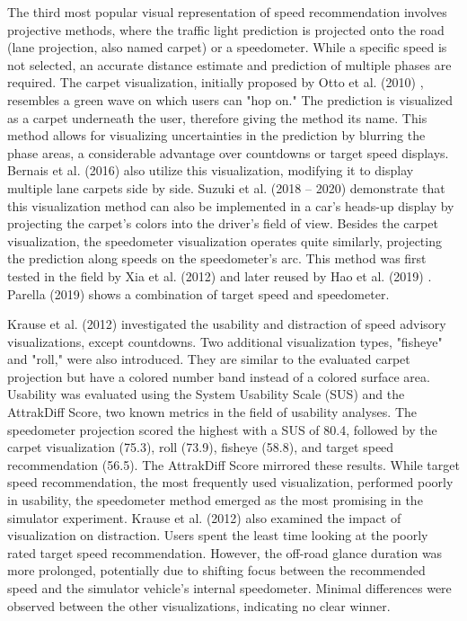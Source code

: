 The third most popular visual representation of speed recommendation involves projective methods, where the traffic light prediction is projected onto the road (lane projection, also named carpet) or a speedometer. While a specific speed is not selected, an accurate distance estimate and prediction of multiple phases are required. The carpet visualization, initially proposed by Otto et al. (2010) \cite{otto_operating_2010}, resembles a green wave on which users can "hop on." The prediction is visualized as a carpet underneath the user, therefore giving the method its name. This method allows for visualizing uncertainties in the prediction by blurring the phase areas, a considerable advantage over countdowns or target speed displays. Bernais et al. (2016) \cite{bernais_design_2016} also utilize this visualization, modifying it to display multiple lane carpets side by side. Suzuki et al. (2018 -- 2020) \cite{suzuki_new_2018, suzuki_safety_2020} demonstrate that this visualization method can also be implemented in a car's heads-up display by projecting the carpet's colors into the driver's field of view. Besides the carpet visualization, the speedometer visualization operates quite similarly, projecting the prediction along speeds on the speedometer's arc. This method was first tested in the field by Xia et al. (2012) \cite{xia_field_2012} and later reused by Hao et al. (2019) \cite{hao_eco-approach_2019}. Parella (2019) \cite{marias_parella_design_2019} shows a combination of target speed and speedometer.

Krause et al. (2012) \cite{krause_traffic_2012} investigated the usability and distraction of speed advisory visualizations, except countdowns. Two additional visualization types, "fisheye" and "roll," were also introduced. They are similar to the evaluated carpet projection but have a colored number band instead of a colored surface area. Usability was evaluated using the System Usability Scale (SUS) and the AttrakDiff Score, two known metrics in the field of usability analyses. The speedometer projection scored the highest with a SUS of 80.4, followed by the carpet visualization (75.3), roll (73.9), fisheye (58.8), and target speed recommendation (56.5). The AttrakDiff Score mirrored these results. While target speed recommendation, the most frequently used visualization, performed poorly in usability, the speedometer method emerged as the most promising in the simulator experiment. Krause et al. (2012) \cite{krause_traffic_2012} also examined the impact of visualization on distraction. Users spent the least time looking at the poorly rated target speed recommendation. However, the off-road glance duration was more prolonged, potentially due to shifting focus between the recommended speed and the simulator vehicle's internal speedometer. Minimal differences were observed between the other visualizations, indicating no clear winner.

